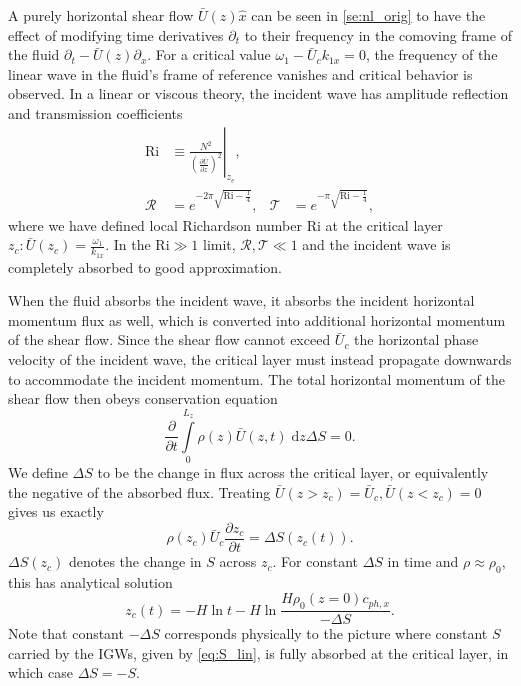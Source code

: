 \documentclass[
        fleqn,
        usenatbib,
    ]{mnras}
\newcommand*{\pd}[2]{\frac{\partial#1}{\partial#2}}
\newcommand*{\at}[1]{\left.#1\right|}
\newcommand*{\p}[1]{\left(#1\right)}
\begin{document}
A purely horizontal shear flow $\bar{U}(z) \hat{x}$ can be seen in
\autoref{se:nl_orig} to have the effect of modifying time derivatives
$\partial_t$ to their frequency in the comoving frame of the fluid $\partial_t -
\bar{U}(z)\partial_x$. For a critical value $\omega_1 - \bar{U}_c k_{1x} = 0$,
the frequency of the linear wave in the fluid's frame of reference vanishes and
critical behavior is observed. In a linear \citep{booker_bretherton} or viscous
\citep{hazel} theory, the incident wave has amplitude reflection and
transmission coefficients
\begin{align}
    \mathrm{Ri} &\equiv \at{\frac{N^2}{\p{\pd{\bar{U}}{z}}^2}}_{z_c},
        \label{eq:ri_def}\\
    \mathcal{R} &= e^{-2\pi \sqrt{\mathrm{Ri} - \frac{1}{4}}}, &
    \mathcal{T} &= e^{-\pi \sqrt{\mathrm{Ri} - \frac{1}{4}}},
        \label{eq:crit_coeffs}
\end{align}
where we have defined local Richardson number Ri at the critical layer $z_c:
\bar{U}(z_c) = \frac{\omega_1}{k_{1x}}$. In the $\mathrm{Ri} \gg 1$ limit,
$\mathcal{R}, \mathcal{T} \ll 1$ and the incident wave is completely absorbed to
good approximation.

When the fluid absorbs the incident wave, it absorbs the incident horizontal
momentum flux as well, which is converted into additional horizontal momentum of
the shear flow. Since the shear flow cannot exceed $\bar{U}_c$ the horizontal
phase velocity of the incident wave, the critical layer must instead propagate
downwards to accommodate the incident momentum. The total horizontal momentum of
the shear flow then obeys conservation equation
\begin{equation}
    \pd{}{t}\int\limits_0^{L_z} \rho(z) \bar{U}(z, t)\;\mathrm{d}z
        \Delta S = 0.
\end{equation}
We define $\Delta S$ to be the change in flux across the critical layer, or
equivalently the negative of the absorbed flux. Treating $\bar{U}(z > z_c) =
\bar{U}_c, \bar{U}(z < z_c) = 0$ gives us exactly
\begin{equation}
    \rho(z_c) \bar{U}_c\pd{z_c}{t} = \Delta S(z_c(t)).\label{eq:zc_anal}
\end{equation}
$\Delta S(z_c)$ denotes the change in $S$ across $z_c$. For constant $\Delta S$
in time and $\rho \approx \rho_0$, this has analytical solution
\begin{equation}
    z_c(t) = -H\ln t - H\ln \frac{H\rho_0(z = 0)c_{ph, x}}{-\Delta S}
        .\label{eq:zc_sol}
\end{equation}
Note that constant $-\Delta S$ corresponds physically to the picture where
constant $S$ carried by the IGWs, given by \autoref{eq:S_lin}, is fully absorbed
at the critical layer, in which case $\Delta S = -S$.
\end{document}
